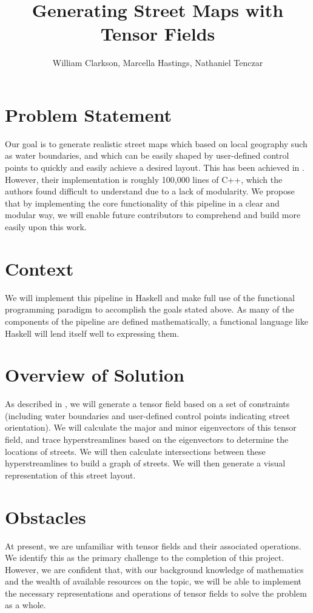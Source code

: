 \documentclass{proc}
\begin{document}
    
\title{Generating Street Maps with Tensor Fields}
\author{William Clarkson, Marcella Hastings, Nathaniel Tenczar}

\maketitle

\section{Problem Statement}
Our goal is to generate realistic street maps which based on local geography
such as water boundaries, and which can be easily shaped by user-defined
control points to quickly and easily achieve a desired layout. This has been
achieved in \cite{wonka}. However, their implementation is roughly 100,000
lines of C++, which the authors found difficult to understand due to a lack
of modularity. We propose that by implementing the core functionality of this
pipeline in a clear and modular way, we will enable future contributors
to comprehend and build more easily upon this work.

\section{Context}
We will implement this pipeline in Haskell and make full use of the functional
programming paradigm to accomplish the goals stated above. As many of the
components of the pipeline are defined mathematically, a functional
language like Haskell will lend itself well to expressing them.

\section{Overview of Solution}
As described in \cite{wonka}, we will generate a tensor field based on a set
of constraints (including water boundaries and user-defined control points
indicating street orientation). We will calculate the major and minor
eigenvectors of this tensor field, and trace hyperstreamlines based on
the eigenvectors to determine the locations of streets. We will then calculate
intersections between these hyperstreamlines to build a graph of streets. We
will then generate a visual representation of this street layout.

\section{Obstacles}
At present, we are unfamiliar with tensor fields and their associated
operations. We identify this as the primary challenge to the completion of this
project. However, we are confident that, with our background knowledge of
mathematics and the wealth of available resources on the topic, we will be able
to implement the necessary representations and operations of tensor fields to
solve the problem as a whole.
\end{document}
